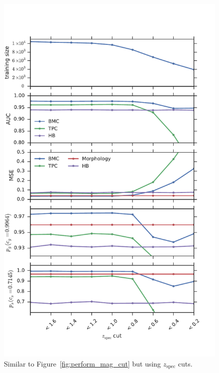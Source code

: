 \begin{figure}[htp]
    \centering
    \includegraphics[width=0.7\linewidth]{figures/perform_z_cut.pdf}
    \caption{Similar to Figure~\ref{fig:perform_mag_cut}
        but using $z_{\text{spec}}$ cuts.}
    \label{fig:perform_z_cut}
\end{figure}


